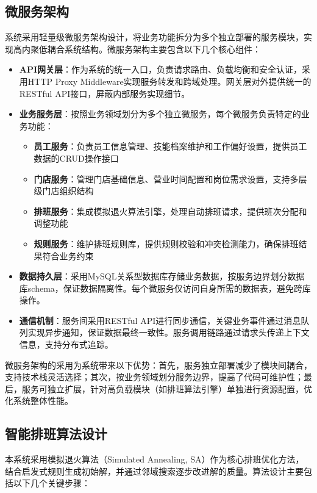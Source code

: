 \documentclass{ctexart}
\begin{document}
\subsection{微服务架构}
系统采用轻量级微服务架构设计，将业务功能拆分为多个独立部署的服务模块，实现高内聚低耦合系统结构。微服务架构主要包含以下几个核心组件：

\begin{itemize}
    \item \textbf{API网关层}：作为系统的统一入口，负责请求路由、负载均衡和安全认证，采用HTTP Proxy Middleware实现服务转发和跨域处理。网关层对外提供统一的RESTful API接口，屏蔽内部服务实现细节。
    
    \item \textbf{业务服务层}：按照业务领域划分为多个独立微服务，每个微服务负责特定的业务功能：
    \begin{itemize}
        \item \textbf{员工服务}：负责员工信息管理、技能档案维护和工作偏好设置，提供员工数据的CRUD操作接口
        \item \textbf{门店服务}：管理门店基础信息、营业时间配置和岗位需求设置，支持多层级门店组织结构
        \item \textbf{排班服务}：集成模拟退火算法引擎，处理自动排班请求，提供班次分配和调整功能
        \item \textbf{规则服务}：维护排班规则库，提供规则校验和冲突检测能力，确保排班结果符合业务约束
    \end{itemize}
    
    \item \textbf{数据持久层}：采用MySQL关系型数据库存储业务数据，按服务边界划分数据库schema，保证数据隔离性。每个微服务仅访问自身所需的数据表，避免跨库操作。
    
    \item \textbf{通信机制}：服务间采用RESTful API进行同步通信，关键业务事件通过消息队列实现异步通知，保证数据最终一致性。服务调用链路通过请求头传递上下文信息，支持分布式追踪。
\end{itemize}

微服务架构的采用为系统带来以下优势：首先，服务独立部署减少了模块间耦合，支持技术栈灵活选择；其次，按业务领域划分服务边界，提高了代码可维护性；最后，服务可独立扩展，针对高负载模块（如排班算法引擎）单独进行资源配置，优化系统整体性能。

\subsection{智能排班算法设计}
本系统采用模拟退火算法（Simulated Annealing, SA）作为核心排班优化方法，结合启发式规则生成初始解，并通过邻域搜索逐步改进解的质量。算法设计主要包括以下几个关键步骤：
\end{document}
